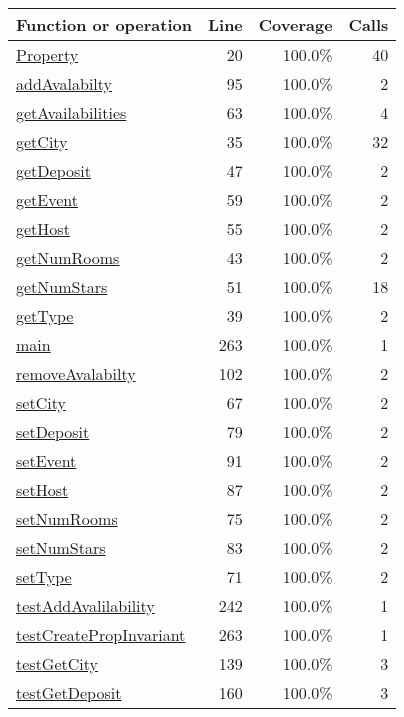 \bigskip
\begin{longtable}{|l|r|r|r|}
\hline
Function or operation & Line & Coverage & Calls \\
\hline
\hline
\hyperref[Property:20]{Property} & 20&100.0\% & 40 \\
\hline
\hyperref[addAvalabilty:95]{addAvalabilty} & 95&100.0\% & 2 \\
\hline
\hyperref[getAvailabilities:63]{getAvailabilities} & 63&100.0\% & 4 \\
\hline
\hyperref[getCity:35]{getCity} & 35&100.0\% & 32 \\
\hline
\hyperref[getDeposit:47]{getDeposit} & 47&100.0\% & 2 \\
\hline
\hyperref[getEvent:59]{getEvent} & 59&100.0\% & 2 \\
\hline
\hyperref[getHost:55]{getHost} & 55&100.0\% & 2 \\
\hline
\hyperref[getNumRooms:43]{getNumRooms} & 43&100.0\% & 2 \\
\hline
\hyperref[getNumStars:51]{getNumStars} & 51&100.0\% & 18 \\
\hline
\hyperref[getType:39]{getType} & 39&100.0\% & 2 \\
\hline
\hyperref[main:263]{main} & 263&100.0\% & 1 \\
\hline
\hyperref[removeAvalabilty:102]{removeAvalabilty} & 102&100.0\% & 2 \\
\hline
\hyperref[setCity:67]{setCity} & 67&100.0\% & 2 \\
\hline
\hyperref[setDeposit:79]{setDeposit} & 79&100.0\% & 2 \\
\hline
\hyperref[setEvent:91]{setEvent} & 91&100.0\% & 2 \\
\hline
\hyperref[setHost:87]{setHost} & 87&100.0\% & 2 \\
\hline
\hyperref[setNumRooms:75]{setNumRooms} & 75&100.0\% & 2 \\
\hline
\hyperref[setNumStars:83]{setNumStars} & 83&100.0\% & 2 \\
\hline
\hyperref[setType:71]{setType} & 71&100.0\% & 2 \\
\hline
\hyperref[testAddAvalilability:242]{testAddAvalilability} & 242&100.0\% & 1 \\
\hline
\hyperref[testCreatePropInvariant:263]{testCreatePropInvariant} & 263&100.0\% & 1 \\
\hline
\hyperref[testGetCity:139]{testGetCity} & 139&100.0\% & 3 \\
\hline
\hyperref[testGetDeposit:160]{testGetDeposit} & 160&100.0\% & 3 \\

\end{longtable}
